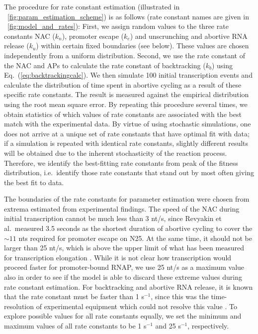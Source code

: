 The procedure for rate constant estimation (illustrated in
\FIG~\ref{fig:param_estimation_scheme}) is as follows (rate constant names
are given in \FIG~\ref{fig:model_and_rates}): First, we assign random values
to the three rate constants NAC ($k_n$), promoter escape ($k_e$) and
unscrunching and abortive RNA release ($k_u$) within certain fixed boundaries
(see below). These values are chosen independently from a uniform
distribution. Second, we use the rate constant of the NAC and APs to
calculate the rate constant of backtracking ($k_b$) using
Eq.~(\ref{eq:backtrackingcalc}). We then simulate 100 initial transcription
events and calculate the distribution of time spent in abortive cycling as a
result of these specific rate constants. The result is measured against the
empirical distribution \cite{revyakin_abortive_2006} using the root mean
square error. By repeating this procedure several times, we obtain statistics
of which values of rate constants are associated with the best match with
the experimental data. By virtue of using stochastic simulations, one does not
arrive at a unique set of rate constants that have optimal fit with data; if a
simulation is repeated with identical rate constants, slightly different
results will be obtained due to the inherent stochasticity of the reaction
process. Therefore, we identify the best-fitting rate constants from peak of
the fitness distribution, i.e.\ identify those rate constants that stand out
by most often giving the best fit to data.

The boundaries of the rate constants for parameter estimation were chosen from
extrema estimated from experimental findings. The speed of the NAC during initial
transcription cannot be much less than 3 nt/s, since Revyakin et al.\ measured
3.5 seconds as the shortest duration of abortive cycling
\cite{revyakin_abortive_2006} to cover the $\sim 11$ nts required for promoter
escape on N25. At the same time, it should not be larger than 25 nt/s,
which is above the upper limit of what has been measured for transcription
elongation \cite{bai_mechanochemical_2007}. While it is not clear how
transcription would proceed faster for promoter-bound RNAP, we use 25 nt/s as
a maximum value also in order to see if the model is able to discard these
extreme values during rate constant estimation. For backtracking and abortive
RNA release, it is known that the rate constant must be faster than 1
s$^{-1}$, since this was the time-resolution of experimental equipment which
could not resolve this value \cite{revyakin_abortive_2006}. To explore
possible values for all rate constants equally, we set the minimum and maximum
values of all rate constants to be 1 s$^{-1}$ and 25 s$^{-1}$, respectively. 


